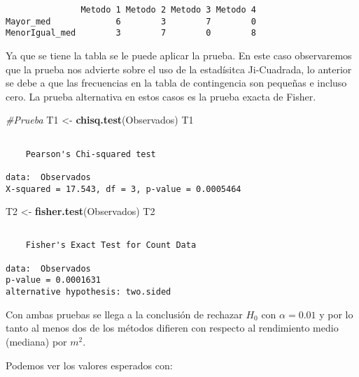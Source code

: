 \documentclass[
  a4paper,
  oneside,
  openany]{book}
\newenvironment{Shaded}{\begin{snugshade}}{\end{snugshade}}
\newcommand{\CommentTok}[1]{\textcolor[rgb]{0.56,0.35,0.01}{\textit{#1}}}
\newcommand{\FunctionTok}[1]{\textcolor[rgb]{0.13,0.29,0.53}{\textbf{#1}}}
\newcommand{\NormalTok}[1]{#1}
\newcommand{\OtherTok}[1]{\textcolor[rgb]{0.56,0.35,0.01}{#1}}
\newcommand{\SpecialCharTok}[1]{\textcolor[rgb]{0.81,0.36,0.00}{\textbf{#1}}}
\begin{document}
\begin{verbatim}
               Metodo 1 Metodo 2 Metodo 3 Metodo 4
Mayor_med             6        3        7        0
MenorIgual_med        3        7        0        8
\end{verbatim}

Ya que se tiene la tabla se le puede aplicar la prueba. En este caso observaremos que la prueba nos advierte sobre el uso de la estadísitca Ji-Cuadrada, lo anterior se debe a que las frecuencias en la tabla de contingencia son pequeñas e incluso cero. La prueba alternativa en estos casos es la prueba exacta de Fisher.

\begin{Shaded}
\begin{Highlighting}[]
\CommentTok{\#Prueba}
\NormalTok{T1 }\OtherTok{\textless{}{-}} \FunctionTok{chisq.test}\NormalTok{(Observados)}
\NormalTok{T1}
\end{Highlighting}
\end{Shaded}

\begin{verbatim}

    Pearson's Chi-squared test

data:  Observados
X-squared = 17.543, df = 3, p-value = 0.0005464
\end{verbatim}

\begin{Shaded}
\begin{Highlighting}[]
\NormalTok{T2 }\OtherTok{\textless{}{-}} \FunctionTok{fisher.test}\NormalTok{(Observados)}
\NormalTok{T2}
\end{Highlighting}
\end{Shaded}

\begin{verbatim}

    Fisher's Exact Test for Count Data

data:  Observados
p-value = 0.0001631
alternative hypothesis: two.sided
\end{verbatim}

Con ambas pruebas se llega a la conclusión de rechazar \(H_0\) con \(\alpha=0.01\) y por lo tanto al menos dos de los métodos difieren con respecto al rendimiento medio (mediana) por \(m^2\).

Podemos ver los valores esperados con:

\begin{Shaded}
\end{Shaded}
\end{document}
